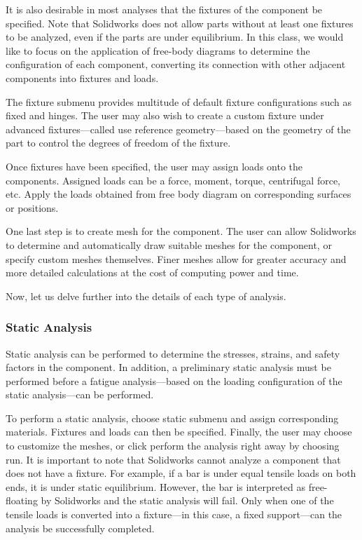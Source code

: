 \documentclass[a4paper,openany,nobib]{tufte-book}
\begin{document}
{{It is also desirable in most analyses that the fixtures of the component
be specified. Note that Solidworks does not allow parts without at least
one fixtures to be analyzed, even if the parts are under equilibrium. In
this class, we would like to focus on the application of free-body
diagrams to determine the configuration of each component, converting
its connection with other adjacent components into fixtures and loads.

The fixture submenu provides multitude of default fixture configurations
such as fixed and hinges. The user may also wish to create a custom
fixture under advanced fixtures---called use reference geometry---based
on the geometry of the part to control the degrees of freedom of the
fixture.

Once fixtures have been specified, the user may assign loads onto the
components. Assigned loads can be a force, moment, torque, centrifugal
force, etc. Apply the loads obtained from free body diagram on
corresponding surfaces or positions.

One last step is to create mesh for the component. The user can allow
Solidworks to determine and automatically draw suitable meshes for the
component, or specify custom meshes themselves. Finer meshes allow for
greater accuracy and more detailed calculations at the cost of computing
power and time.

Now, let us delve further into the details of each type of analysis.

\subsubsection{Static Analysis}
\label{static-analysis}
Static analysis can be performed to determine the stresses, strains, and
safety factors in the component. In addition, a preliminary static
analysis must be performed before a fatigue analysis---based on the
loading configuration of the static analysis---can be performed.

To perform a static analysis, choose static submenu and assign
corresponding materials. Fixtures and loads can then be specified.
Finally, the user may choose to customize the meshes, or click perform
the analysis right away by choosing run. It is important to note that
Solidworks cannot analyze a component that does not have a fixture. For
example, if a bar is under equal tensile loads on both ends, it is under
static equilibrium. However, the bar is interpreted as free-floating by
Solidworks and the static analysis will fail. Only when one of the
tensile loads is converted into a fixture---in this case, a fixed
support---can the analysis be successfully completed.

}}
\end{document}
